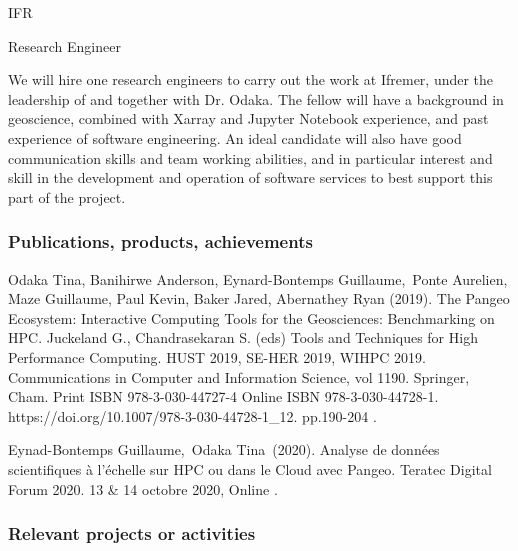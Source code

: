 \begin{sitedescription}{IFR}
%


\begin{participant}[PM=72, type=R]{Research Engineer }

We will hire one research engineers to carry out the work
at Ifremer, under the leadership of and together with Dr. Odaka.  The
fellow will have a background in geoscience, combined with Xarray
and Jupyter Notebook experience, and past experience of software engineering.
An ideal candidate will also have good communication skills and team working
abilities, and in particular interest and skill in the development and
operation of software services to best support this part of the project.

\end{participant}


\subsubsection*{Publications, products, achievements}
\begin{compactenum}
\item Odaka Tina, Banihirwe Anderson, Eynard-Bontemps Guillaume, Ponte Aurelien,
Maze Guillaume, Paul Kevin, Baker Jared, Abernathey Ryan (2019).
The Pangeo Ecosystem: Interactive Computing Tools for the Geosciences:
Benchmarking on HPC.
Juckeland G., Chandrasekaran S. (eds) Tools and Techniques for High Performance Computing.
HUST 2019, SE-HER 2019, WIHPC 2019. Communications in Computer and Information Science,
vol 1190. Springer, Cham. Print ISBN 978-3-030-44727-4 Online
ISBN 978-3-030-44728-1. https://doi.org/10.1007/978-3-030-44728-1_12. pp.190-204 .

\item Eynad-Bontemps Guillaume, Odaka Tina (2020).
Analyse de données scientifiques à l’échelle sur HPC ou dans le Cloud avec Pangeo.
Teratec Digital Forum 2020. 13 & 14 octobre 2020, Online .



\end{compactenum}

\subsubsection*{Relevant projects or activities}


\end{sitedescription}
